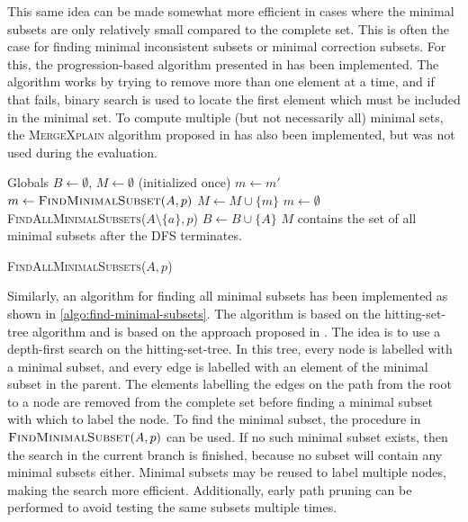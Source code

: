 This same idea can be made somewhat more efficient in cases where the minimal subsets are only relatively small compared to the complete set. This is often the case for finding minimal inconsistent subsets or minimal correction subsets. For this, the progression-based algorithm presented in \cite{marques2013minimal} has been implemented. The algorithm works by trying to remove more than one element at a time, and if that fails, binary search is used to locate the first element which must be included in the minimal set.
To compute multiple (but not necessarily all) minimal sets, the \textsc{MergeXplain} algorithm proposed in \cite{shchekotykhin2015mergexplain} has also been implemented, but was not used during the evaluation.

\begin{algorithm}[ht]
  \begin{algorithmic}
    \State Globals \enspace $B \gets \emptyset$, \enspace $M \gets \emptyset$ \quad (initialized once)
        \State $m \gets m'$
        \State $m \gets \textsc{FindMinimalSubset}(A, p)$
        \State $M \gets M \cup \{ m \}$
      \Else
        \State $m \gets \emptyset$
      \EndIf
        \State \textsc{FindAllMinimalSubsets}($A \setminus \{ a \}, p$)
      \EndFor
      \State $B \gets B \cup \{ A \}$
    \EndIf
    \State $M$ contains the set of all minimal subsets after the DFS terminates.
  \end{algorithmic}
  \caption{\textsc{FindAllMinimalSubsets}($A, p$)}
  \label{algo:find-minimal-subsets}
\end{algorithm}

Similarly, an algorithm for finding all minimal subsets has been implemented as shown in \cref{algo:find-minimal-subsets}. The algorithm is based on the hitting-set-tree algorithm \cite{reiter1987theory} and is based on the approach proposed in \cite{kalyanpur2007finding}. The idea is to use a depth-first search on the hitting-set-tree. In this tree, every node is labelled with a minimal subset, and every edge is labelled with an element of the minimal subset in the parent. The elements labelling the edges on the path from the root to a node are removed from the complete set before finding a minimal subset with which to label the node. To find the minimal subset, the procedure in $\textsc{FindMinimalSubset}(A, p)$ can be used. If no such minimal subset exists, then the search in the current branch is finished, because no subset will contain any minimal subsets either. Minimal subsets may be reused to label multiple nodes, making the search more efficient. Additionally, early path pruning can be performed to avoid testing the same subsets multiple times.

